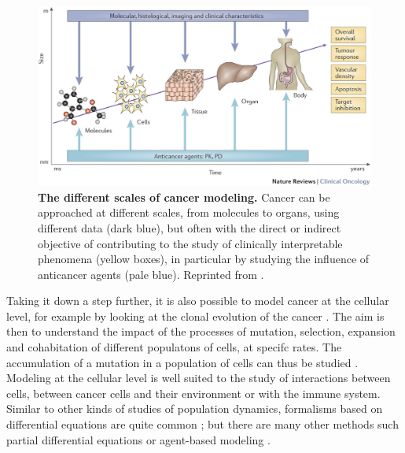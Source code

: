 \documentclass[a4paper,12pt,twoside,onecolumn,openright,final,oldfontcommands]{memoir}
\begin{document}
\begin{figure}

{\centering \includegraphics[width=0.9\linewidth]{fig/multiscale} 

}

\caption[The different scales of cancer modeling]{\textbf{The different scales of cancer
modeling.} Cancer can be approached at different scales, from molecules
to organs, using different data (dark blue), but often with the direct
or indirect objective of contributing to the study of clinically
interpretable phenomena (yellow boxes), in particular by studying the
influence of anticancer agents (pale blue). Reprinted from
\citet{barbolosi2016computational}.}\label{fig:multiscale}
\end{figure}









Taking it down a step further, it is also possible to model cancer at
the cellular level, for example by looking at the clonal evolution of
the cancer \citep{altrock2015mathematics}. The aim is then to understand
the impact of the processes of mutation, selection, expansion and
cohabitation of different populatons of cells, at specifc rates. The
accumulation of a mutation in a population of cells can thus be studied
\citep{bozic2010accumulation}. Modeling at the cellular level is well
suited to the study of interactions between cells, between cancer cells
and their environment or with the immune system. Similar to other kinds
of studies of population dynamics, formalisms based on differential
equations are quite common \citep{bellomo2008foundations}; but there are
many other methods such partial differential equations or agent-based
modeling \citep{letort2019physiboss}.
\end{document}
